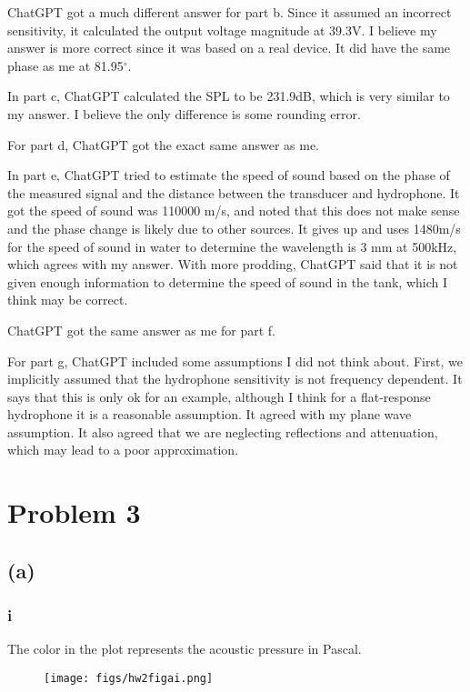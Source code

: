 \documentclass[12 pt]{article}
\begin{document}
ChatGPT got a much different answer for part b. Since it assumed an incorrect sensitivity, it calculated the output voltage
magnitude at 39.3V. I believe my answer is more correct since it was based on a real device. It did have the same phase
as me at 81.95$^{\circ}$.

In part c, ChatGPT calculated the SPL to be 231.9dB, which is very similar to my answer. I believe the only difference
is some rounding error.

For part d, ChatGPT got the exact same answer as me.

In part e, ChatGPT tried to estimate the speed of sound based on the phase of the measured signal and the distance
between the transducer and hydrophone. It got the speed of sound was 110000 m/s, and noted that this does not make sense
and the phase change is likely due to other sources. It gives up and uses 1480m/s for the speed of sound in water to
determine the wavelength is 3 mm at 500kHz, which agrees with my answer. With more prodding, ChatGPT said that it is not
given enough information to determine the speed of sound in the tank, which I think may be correct.

ChatGPT got the same answer as me for part f.

For part g, ChatGPT included some assumptions I did not think about. First, we implicitly assumed that the hydrophone
sensitivity is not frequency dependent. It says that this is only ok for an example, although I think for a
flat-response hydrophone it is a reasonable assumption. It agreed with my plane wave assumption. It also agreed that we
are neglecting reflections and attenuation, which may lead to a poor approximation.

\section*{Problem 3}
\subsection*{(a)}
\subsubsection*{i}
The color in the plot represents the acoustic pressure in Pascal.
\begin{figure}[H]
    \centering
    \texttt{[image: figs/hw2figai.png]}
\end{figure} \par
\end{document}
